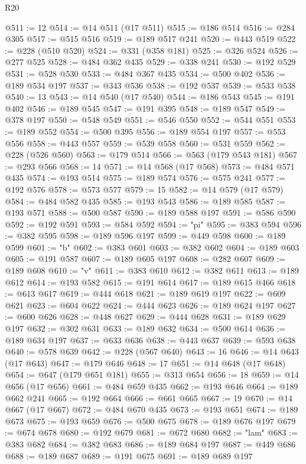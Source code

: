 \begin{lexlean}{R20}
\begin{coremodule}
@511 := 12
@514 := @14 @511 (@17 @511)
@515 := @186 @514
@516 := @284 @305
@517 := @515 @516
@519 := @189 @517 @241
@520 := @443 @519
@522 := @228 (@510 @520)
@524 := @331 (@358 @181)
@525 := @326 @524
@526 := @277 @525
@528 := @484 @362 @435
@529 := @338 @241
@530 := @192 @529
@531 := @528 @530
@533 := @484 @367 @435
@534 := @500 @402
@536 := @189 @534 @197
@537 := @343 @536
@538 := @192 @537
@539 := @533 @538
@540 := 13
@543 := @14 @540 (@17 @540)
@544 := @186 @543
@545 := @191 @402
@546 := @189 @545
@547 := @191 @395
@548 := @189 @547
@549 := @378 @197
@550 := @548 @549
@551 := @546 @550
@552 := @544 @551
@553 := @189 @552
@554 := @500 @395
@556 := @189 @554 @197
@557 := @553 @556
@558 := @443 @557
@559 := @539 @558
@560 := @531 @559
@562 := @228 (@526 @560)
@563 := @179 @514
@566 := @563 (@179 @543 @181)
@567 := @293 @566
@568 := 14
@571 := @14 @568 (@17 @568)
@573 := @484 @571 @435
@574 := @193 @514
@575 := @189 @574
@576 := @575 @241
@577 := @192 @576
@578 := @573 @577
@579 := 15
@582 := @14 @579 (@17 @579)
@584 := @484 @582 @435
@585 := @193 @543
@586 := @189 @585
@587 := @193 @571
@588 := @500 @587
@590 := @189 @588 @197
@591 := @586 @590
@592 := @192 @591
@593 := @584 @592
@594 := "pi"
@595 := @383 @594
@596 := @382 @595
@598 := @189 @596 @197
@599 := @449 @598
@600 := @189 @599
@601 := "b"
@602 := @383 @601
@603 := @382 @602
@604 := @189 @603
@605 := @191 @587
@607 := @189 @605 @197
@608 := @282 @607
@609 := @189 @608
@610 := "v"
@611 := @383 @610
@612 := @382 @611
@613 := @189 @612
@614 := @193 @582
@615 := @191 @614
@617 := @189 @615 @466
@618 := @613 @617
@619 := @444 @618
@621 := @189 @619 @197
@622 := @609 @621
@623 := @604 @622
@624 := @444 @623
@626 := @189 @624 @197
@627 := @600 @626
@628 := @448 @627
@629 := @444 @628
@631 := @189 @629 @197
@632 := @302 @631
@633 := @189 @632
@634 := @500 @614
@636 := @189 @634 @197
@637 := @633 @636
@638 := @443 @637
@639 := @593 @638
@640 := @578 @639
@642 := @228 (@567 @640)
@643 := 16
@646 := @14 @643 (@17 @643)
@647 := @179 @646
@648 := 17
@651 := @14 @648 (@17 @648)
@654 := @647 (@179 @651 @181)
@655 := @313 @654
@656 := 18
@659 := @14 @656 (@17 @656)
@661 := @484 @659 @435
@662 := @193 @646
@664 := @189 @662 @241
@665 := @192 @664
@666 := @661 @665
@667 := 19
@670 := @14 @667 (@17 @667)
@672 := @484 @670 @435
@673 := @193 @651
@674 := @189 @673
@675 := @193 @659
@676 := @500 @675
@678 := @189 @676 @197
@679 := @674 @678
@680 := @192 @679
@681 := @672 @680
@682 := "lam"
@683 := @383 @682
@684 := @382 @683
@686 := @189 @684 @197
@687 := @449 @686
@688 := @189 @687
@689 := @191 @675
@691 := @189 @689 @197

\end{coremodule}
\end{lexlean}
